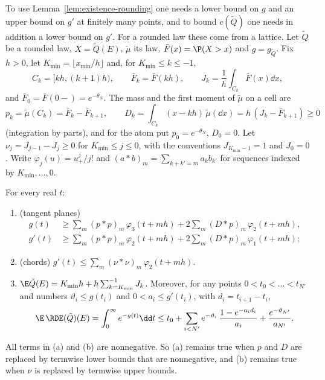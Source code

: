 To use Lemma~\ref{lem:existence-rounding} one needs a lower bound on $g$ and an upper bound on
$g'$ at finitely many points, and to bound $c(\tilde Q)$ one needs in addition a lower bound
on $g'$. For a rounded law these come from a lattice. Let $\tilde Q$ be a rounded law,
$X=\tilde Q(E)$, $\tilde\mu$ its law, $\bar F(x)=\P(X>x)$ and $g=g_{\tilde Q}$. Fix $h>0$, let
$K_{\min}=\lfloor x_{\min}/h\rfloor$ and, for $K_{\min}\le k\le-1$,
\[
  C_k=[kh,(k+1)h),\qquad \bar F_k=\bar F(kh),\qquad J_k=\frac1h\int_{C_k}\bar F(x)\dd x ,
\]
and $\bar F_0=\bar F(0-)=e^{-\theta_N}$. The mass and the first moment of $\tilde\mu$ on a cell
are
\[
  p_k=\tilde\mu(C_k)=\bar F_k-\bar F_{k+1},\qquad
  D_k=\int_{C_k}(x-kh)\,\tilde\mu(\dd x)=h\,(J_k-\bar F_{k+1})\ge0
\]
(integration by parts), and for the atom put $p_0=e^{-\theta_N}$, $D_0=0$. Let
$\nu_j=J_{j-1}-J_j\ge0$ for $K_{\min}\le j\le0$, with the conventions $J_{K_{\min}-1}=1$ and
$J_0=0$. Write $\varphi_j(u)=u_+^j/j!$ and $(a*b)_m=\sum_{k+k'=m}a_kb_{k'}$ for sequences
indexed by $K_{\min},\dots,0$.

\begin{lemma}\label{lem:existence-enclosures}
For every real $t$:
\begin{enumerate}
\item[(a)] (tangent planes)
\begin{align*}
  g(t)&\ge\sum_m(p*p)_m\,\varphi_3(t+mh)+2\sum_m(D*p)_m\,\varphi_2(t+mh),\\
  g'(t)&\ge\sum_m(p*p)_m\,\varphi_2(t+mh)+2\sum_m(D*p)_m\,\varphi_1(t+mh);
\end{align*}
\item[(b)] (chords) $g'(t)\le\sum_m(\nu*\nu)_m\,\varphi_2(t+mh)$.
\item[(c)] $\E\tilde Q(E)=K_{\min}h+h\sum_{k=K_{\min}}^{-1}J_k$. Moreover, for any points
$0<t_0<\dots<t_{N'}$ and numbers $\vartheta_i\le g(t_i)$ and $0<a_i\le g'(t_i)$, with
$d_i=t_{i+1}-t_i$,
\[
  \E\,\RDE(\tilde Q)(E)=\int_0^\infty e^{-g(t)}\dd t
  \le t_0+\sum_{i<N'}e^{-\vartheta_i}\,\frac{1-e^{-a_id_i}}{a_i}+\frac{e^{-\vartheta_{N'}}}{a_{N'}}.
\]
\end{enumerate}
All terms in (a) and (b) are nonnegative. So (a) remains true when $p$ and $D$ are replaced by
termwise lower bounds that are nonnegative, and (b) remains true when $\nu$ is replaced by
termwise upper bounds.
\end{lemma}

